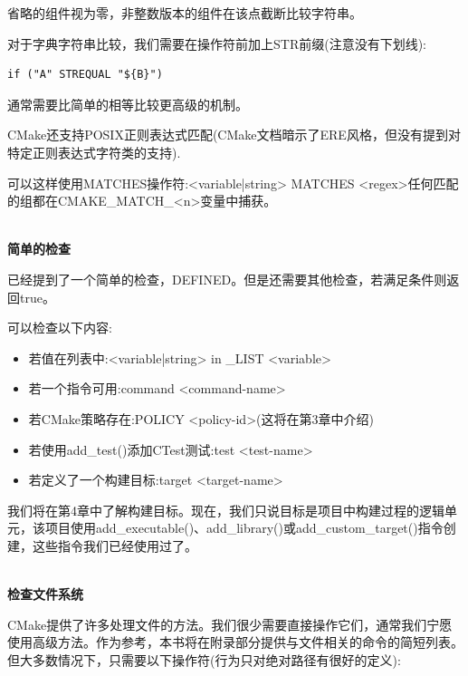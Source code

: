省略的组件视为零，非整数版本的组件在该点截断比较字符串。

对于字典字符串比较，我们需要在操作符前加上STR前缀(注意没有下划线):

\begin{lstlisting}[style=styleCMake]
if ("A" STREQUAL "${B}")
\end{lstlisting}

通常需要比简单的相等比较更高级的机制。

CMake还支持POSIX正则表达式匹配(CMake文档暗示了ERE风格，但没有提到对特定正则表达式字符类的支持).

可以这样使用MATCHES操作符:<variable|string> MATCHES <regex>任何匹配的组都在CMAKE\_MATCH\_<n>变量中捕获。

\hspace*{\fill} \\ %
\noindent
\textbf{简单的检查}

已经提到了一个简单的检查，DEFINED。但是还需要其他检查，若满足条件则返回true。

可以检查以下内容:

\begin{itemize}
\item 
若值在列表中:<variable|string> in \_LIST <variable>

\item 
若一个指令可用:command <command-name>

\item 
若CMake策略存在:POLICY <policy-id>(这将在第3章中介绍)

\item 
若使用add\_test()添加CTest测试:test <test-name>

\item 
若定义了一个构建目标:target <target-name>
\end{itemize}

我们将在第4章中了解构建目标。现在，我们只说目标是项目中构建过程的逻辑单元，该项目使用add\_executable()、add\_library()或add\_custom\_target()指令创建，这些指令我们已经使用过了。

\hspace*{\fill} \\ %
\noindent
\textbf{检查文件系统}

CMake提供了许多处理文件的方法。我们很少需要直接操作它们，通常我们宁愿使用高级方法。作为参考，本书将在附录部分提供与文件相关的命令的简短列表。但大多数情况下，只需要以下操作符(行为只对绝对路径有很好的定义):

